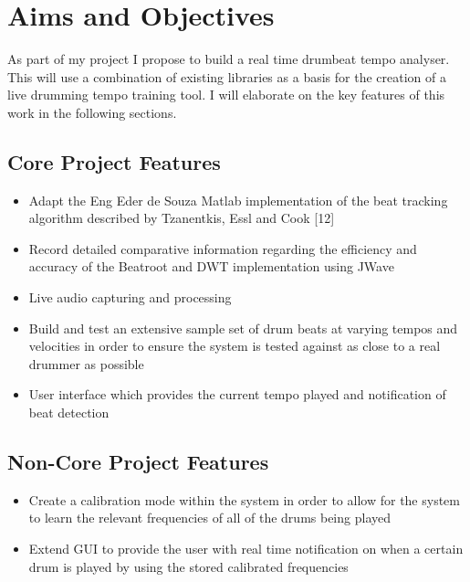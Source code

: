 \documentclass[a4paper, 11pt]{article}
\begin{document}
\maketitle{}
\section{Aims and Objectives}

As part of my project I propose to build a real time drumbeat tempo analyser. This will use a combination of existing libraries as a basis for the creation of a live drumming tempo training tool. I will elaborate on the key features of this work in the following sections.


\subsection{Core Project Features}
\begin{itemize}
\item Adapt the Eng Eder de Souza Matlab implementation of the beat tracking algorithm described by Tzanentkis, Essl and Cook [12] 
\item Record detailed comparative information regarding the efficiency and accuracy of the Beatroot and DWT implementation using JWave
\item Live audio capturing and processing
\item Build and test an extensive sample set of drum beats at varying tempos and velocities in order to ensure the system is tested against as close to a real drummer as possible
\item User interface which provides the current tempo played and notification of beat detection
\end{itemize}

\subsection{Non-Core Project Features}
\begin{itemize}
\item Create a calibration mode within the system in order to allow for the system to learn the relevant frequencies of all of the drums being played
\item Extend GUI to provide the user with real time notification on when a certain drum is played by using the stored calibrated frequencies
\end{itemize}

\maketitle{} 
\end{document}
